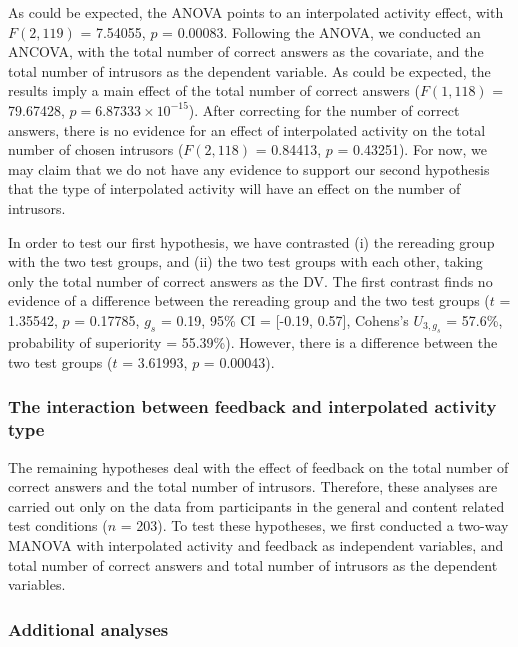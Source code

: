 \documentclass[11pt,]{article}
\begin{document}
As could be expected, the ANOVA points to an interpolated activity
effect, with \(F(2, 119)\) = 7.54055, \(p\) = 0.00083. Following the
ANOVA, we conducted an ANCOVA, with the total number of correct answers
as the covariate, and the total number of intrusors as the dependent
variable. As could be expected, the results imply a main effect of the
total number of correct answers (\(F(1, 118)\) = 79.67428,
\(p = 6.87333\times 10^{-15}\)). After correcting for the number of
correct answers, there is no evidence for an effect of interpolated
activity on the total number of chosen intrusors (\(F (2, 118)\) =
0.84413, \(p\) = 0.43251). For now, we may claim that we do not have any
evidence to support our second hypothesis that the type of interpolated
activity will have an effect on the number of intrusors.

In order to test our first hypothesis, we have contrasted (i) the
rereading group with the two test groups, and (ii) the two test groups
with each other, taking only the total number of correct answers as the
DV. The first contrast finds no evidence of a difference between the
rereading group and the two test groups (\(t\) = 1.35542, \(p\) =
0.17785, \(g_s\) = 0.19, 95\% CI = {[}-0.19, 0.57{]}, Cohens's
\(U_{3, g_s}\) = 57.6\%, probability of superiority = 55.39\%). However,
there is a difference between the two test groups (\(t\) = 3.61993,
\(p\) = 0.00043).

\hypertarget{the-interaction-between-feedback-and-interpolated-activity-type}{%
\subsubsection{The interaction between feedback and interpolated
activity
type}\label{the-interaction-between-feedback-and-interpolated-activity-type}}

The remaining hypotheses deal with the effect of feedback on the total
number of correct answers and the total number of intrusors. Therefore,
these analyses are carried out only on the data from participants in the
general and content related test conditions (\(n\) = 203). To test these
hypotheses, we first conducted a two-way MANOVA with interpolated
activity and feedback as independent variables, and total number of
correct answers and total number of intrusors as the dependent
variables.

\hypertarget{additional-analyses}{%
\subsubsection{Additional analyses}\label{additional-analyses}}

\onecolumn



\end{document}

